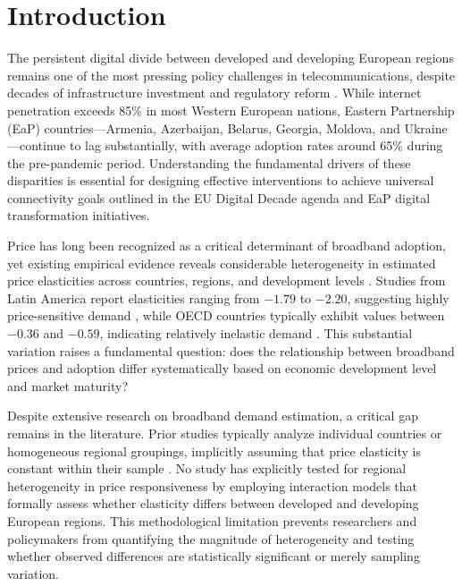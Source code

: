 \documentclass[12pt,review]{elsarticle}
\begin{document}
\section{Introduction}
\label{sec:intro}

The persistent digital divide between developed and developing European regions remains one of the most pressing policy challenges in telecommunications, despite decades of infrastructure investment and regulatory reform \citep{galperin2017price}. While internet penetration exceeds 85\% in most Western European nations, Eastern Partnership (EaP) countries—Armenia, Azerbaijan, Belarus, Georgia, Moldova, and Ukraine—continue to lag substantially, with average adoption rates around 65\% during the pre-pandemic period. Understanding the fundamental drivers of these disparities is essential for designing effective interventions to achieve universal connectivity goals outlined in the EU Digital Decade agenda and EaP digital transformation initiatives.

Price has long been recognized as a critical determinant of broadband adoption, yet existing empirical evidence reveals considerable heterogeneity in estimated price elasticities across countries, regions, and development levels \citep{hauge2010demand, galperin2017price}. Studies from Latin America report elasticities ranging from $-1.79$ to $-2.20$, suggesting highly price-sensitive demand \citep{macedo2011elasticity}, while OECD countries typically exhibit values between $-0.36$ and $-0.59$, indicating relatively inelastic demand \citep{cardona2009demand}. This substantial variation raises a fundamental question: does the relationship between broadband prices and adoption differ systematically based on economic development level and market maturity?

Despite extensive research on broadband demand estimation, a critical gap remains in the literature. Prior studies typically analyze individual countries or homogeneous regional groupings, implicitly assuming that price elasticity is constant within their sample \citep{roller1996telecommunications, hauge2010demand}. No study has explicitly tested for regional heterogeneity in price responsiveness by employing interaction models that formally assess whether elasticity differs between developed and developing European regions. This methodological limitation prevents researchers and policymakers from quantifying the magnitude of heterogeneity and testing whether observed differences are statistically significant or merely sampling variation.
\end{document}
